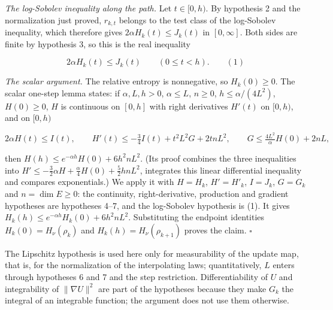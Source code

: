 \documentclass[11pt,a4paper]{article}
\begin{document}
\emph{The log-Sobolev inequality along the path.} Let \(t\in[0,h)\). By hypothesis 2 and the normalization just proved, \(r_{k,t}\) belongs to the test class of the log-Sobolev inequality, which therefore gives \(2\alpha H_k(t)\le J_k(t)\) in \([0,\infty]\). Both sides are finite by hypothesis 3, so this is the real inequality


\[2\alpha H_k(t)\le J_k(t)\qquad(0\le t<h).\qquad(1)\]


\emph{The scalar argument.} The relative entropy is nonnegative, so \(H_k(0)\ge0\). The scalar one-step lemma \cite[Section~3.18.2]{LangevinLean2026ULALSI} states: if \(\alpha,L,h>0\), \(\alpha\le L\), \(n\ge0\), \(h\le\alpha/(4L^2)\), \(H(0)\ge0\), \(H\) is continuous on \([0,h]\) with right derivatives \(H'(t)\) on \([0,h)\), and on \([0,h)\)


\[2\alpha H(t)\le I(t),\qquad H'(t)\le-\tfrac34I(t)+t^2L^2G+2tnL^2,\qquad G\le\tfrac{4L^2}{\alpha}H(0)+2nL,\]


then \(H(h)\le e^{-\alpha h}H(0)+6h^2nL^2\). (Its proof combines the three inequalities into \(H'\le-\frac32\alpha H+\frac\alpha4H(0)+\frac52hnL^2\), integrates this linear differential inequality and compares exponentials.) We apply it with \(H=H_k\), \(H'=H'_k\), \(I=J_k\), \(G=G_k\) and \(n=\dim E\ge0\): the continuity, right-derivative, production and gradient hypotheses are hypotheses 4–7, and the log-Sobolev hypothesis is (1). It gives \(H_k(h)\le e^{-\alpha h}H_k(0)+6h^2nL^2\). Substituting the endpoint identities \(H_k(0)=H_\nu(\rho_k)\) and \(H_k(h)=H_\nu(\rho_{k+1})\) proves the claim. \(\square\)




The Lipschitz hypothesis is used here only for measurability of the update map, that is, for the normalization of the interpolating laws; quantitatively, \(L\) enters through hypotheses 6 and 7 and the step restriction. Differentiability of \(U\) and integrability of \(\|\nabla U\|^2\) are part of the hypotheses because they make \(G_k\) the integral of an integrable function; the argument does not use them otherwise.
\end{document}
